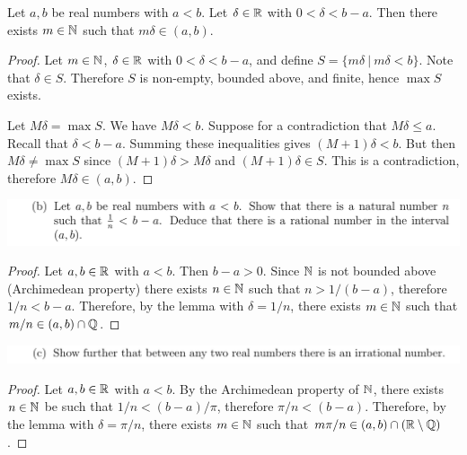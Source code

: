 \documentclass[12pt]{article}
\begin{document}
\begin{lemma*}
  Let $a, b$ be real numbers with $a < b$. Let $\delta \in \mathbb{R}$ with $0 < \delta < b - a$. Then
  there exists $m \in \mathbb{N}$ such that $m\delta \in (a, b)$.
\end{lemma*}

\begin{proof}
  Let $m \in \mathbb{N}$, $\delta \in \mathbb{R}$ with $0 < \delta < b - a$, and define
  $S = \{m\delta ~|~ m\delta < b\}$. Note that $\delta \in S$. Therefore $S$ is non-empty, bounded
  above, and finite, hence $\max S$ exists.

  Let $M\delta = \max S$. We have $M\delta < b$. Suppose for a contradiction that $M\delta \leq
  a$. Recall that $\delta < b - a$. Summing these inequalities gives $(M + 1)\delta < b$. But then
  $M\delta \neq \max S$ since $(M + 1)\delta > M\delta$ and $(M + 1)\delta \in S$. This is a
  contradiction, therefore $M\delta \in (a, b)$.
\end{proof}

\begin{mdframed}
  \includegraphics[width=400pt]{img/oxford-M2-analysis-I-2-7-b.png}
\end{mdframed}

\begin{proof}
  Let $a, b \in \mathbb{R}$ with $a < b$. Then $b - a > 0$. Since $\mathbb{N}$ is not bounded above (Archimedean
  property) there exists $n \in \mathbb{N}$ such that $n > 1/(b - a)$, therefore $1/n < b - a$. Therefore,
  by the lemma with $\delta = 1/n$, there exists $m \in \mathbb{N}$ such that $m/n \in (a, b) \cap \mathbb{Q}$.
\end{proof}

\begin{mdframed}
  \includegraphics[width=400pt]{img/oxford-M2-analysis-I-2-7-c.png}
\end{mdframed}

\begin{proof}
  Let $a, b \in \mathbb{R}$ with $a < b$. By the Archimedean property of $\mathbb{N}$, there exists $n \in \mathbb{N}$ be
  such that $1/n < (b - a)/\pi$, therefore $\pi/n < (b - a)$. Therefore, by the lemma with
  $\delta = \pi/n$, there exists $m \in \mathbb{N}$ such that $m\pi/n \in (a, b) \cap (\mathbb{R}\setminus\mathbb{Q})$.
\end{proof}
\newpage
\end{document}
